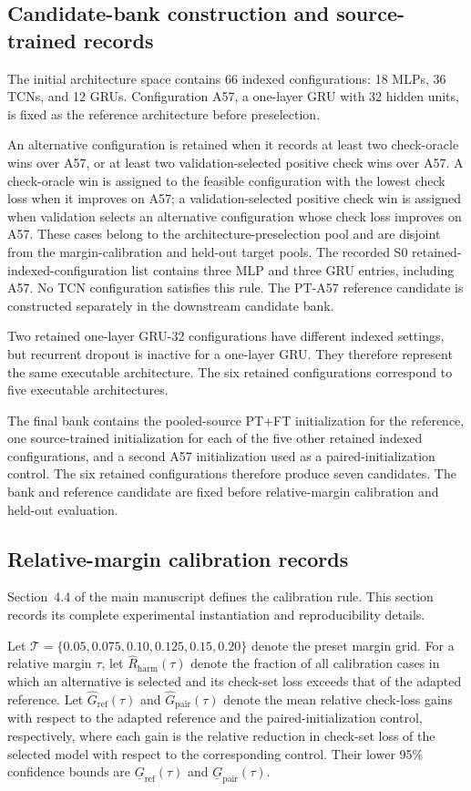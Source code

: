 \documentclass[11pt,a4paper]{article}
\begin{document}
\subsection{Candidate-bank construction and source-trained records}

The initial architecture space contains 66 indexed configurations: 18 MLPs,
36 TCNs, and 12 GRUs. Configuration A57, a one-layer GRU with 32 hidden
units, is fixed as the reference architecture before preselection.

An alternative configuration is retained when it records at least two
check-oracle wins over A57, or at least two validation-selected positive check
wins over A57. A check-oracle win is assigned to the feasible configuration
with the lowest check loss when it improves on A57; a validation-selected
positive check win is assigned when validation selects an alternative
configuration whose check loss improves on A57.
These cases belong to the architecture-preselection pool and are disjoint from
the margin-calibration and held-out target pools.
The recorded S0 retained-indexed-configuration list contains three MLP and
three GRU entries, including A57. No TCN configuration satisfies this rule.
The PT-A57 reference candidate is constructed separately in the downstream
candidate bank.

Two retained one-layer GRU-32 configurations have different indexed
settings, but recurrent dropout is inactive for a one-layer GRU. They
therefore represent the same executable architecture. The six retained
configurations correspond to five executable architectures.

The final bank contains the pooled-source PT+FT initialization for
the reference, one source-trained initialization for each of the five other
retained indexed configurations, and a second A57 initialization used as a
paired-initialization control. The six retained configurations therefore
produce seven candidates. The bank and reference candidate are fixed
before relative-margin calibration and held-out evaluation.

\subsection{Relative-margin calibration records}

Section~4.4 of the main manuscript defines the calibration rule. This section
records its complete experimental instantiation and reproducibility details.

Let
$\mathcal{T}=\{0.05,0.075,0.10,0.125,0.15,0.20\}$
denote the preset margin grid. For a relative margin $\tau$, let
$\widehat R_{\mathrm{harm}}(\tau)$ denote the fraction of all calibration
cases in which an alternative is selected and its check-set loss exceeds that
of the adapted reference. Let $\widehat G_{\mathrm{ref}}(\tau)$ and
$\widehat G_{\mathrm{pair}}(\tau)$ denote the mean relative check-loss gains
with respect to the adapted reference and the paired-initialization control,
respectively, where each gain is the relative reduction in check-set loss of
the selected model with respect to the corresponding control. Their lower
95\% confidence bounds are
$\underline G_{\mathrm{ref}}(\tau)$ and
$\underline G_{\mathrm{pair}}(\tau)$.
\end{document}
